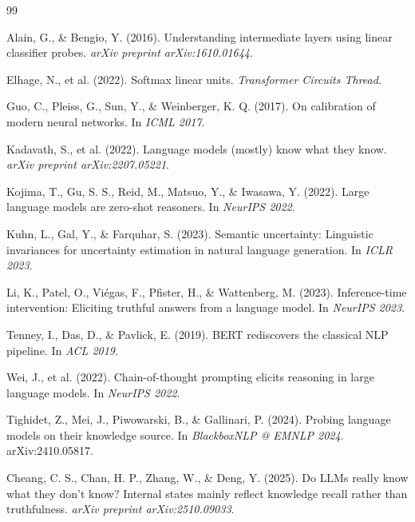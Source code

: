\documentclass[11pt]{article}
\begin{document}

\begin{thebibliography}{99}

Alain, G., \& Bengio, Y. (2016).
Understanding intermediate layers using linear classifier probes.
\emph{arXiv preprint arXiv:1610.01644}.

Elhage, N., et al. (2022).
Softmax linear units.
\emph{Transformer Circuits Thread}.

Guo, C., Pleiss, G., Sun, Y., \& Weinberger, K. Q. (2017).
On calibration of modern neural networks.
In \emph{ICML 2017}.

Kadavath, S., et al. (2022).
Language models (mostly) know what they know.
\emph{arXiv preprint arXiv:2207.05221}.

Kojima, T., Gu, S. S., Reid, M., Matsuo, Y., \& Iwasawa, Y. (2022).
Large language models are zero-shot reasoners.
In \emph{NeurIPS 2022}.

Kuhn, L., Gal, Y., \& Farquhar, S. (2023).
Semantic uncertainty: Linguistic invariances for uncertainty estimation in natural
language generation.
In \emph{ICLR 2023}.

Li, K., Patel, O., Vi\'{e}gas, F., Pfister, H., \& Wattenberg, M. (2023).
Inference-time intervention: Eliciting truthful answers from a language model.
In \emph{NeurIPS 2023}.

Tenney, I., Das, D., \& Pavlick, E. (2019).
BERT rediscovers the classical NLP pipeline.
In \emph{ACL 2019}.

Wei, J., et al. (2022).
Chain-of-thought prompting elicits reasoning in large language models.
In \emph{NeurIPS 2022}.

Tighidet, Z., Mei, J., Piwowarski, B., \& Gallinari, P. (2024).
Probing language models on their knowledge source.
In \emph{BlackboxNLP @ EMNLP 2024}. arXiv:2410.05817.

Cheang, C. S., Chan, H. P., Zhang, W., \& Deng, Y. (2025).
Do {LLMs} really know what they don't know? Internal states mainly reflect knowledge
recall rather than truthfulness.
\emph{arXiv preprint arXiv:2510.09033}.


\end{thebibliography}
\end{document}
